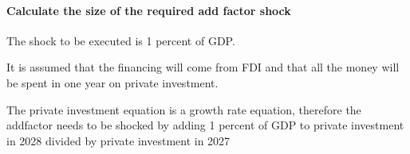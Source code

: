 \documentclass[letterpaper,10pt,english]{jupyterBook}
\begin{document}
\paragraph{Calculate the size of the required add factor shock}
\label{\detokenize{content/06_WBModels/ScenarioAnalysis:calculate-the-size-of-the-required-add-factor-shock}}
\sphinxAtStartPar
The shock to be executed is 1 percent of GDP.

\sphinxAtStartPar
It is assumed that the financing will come from FDI and that all the money will be spent in one year on private investment.

\sphinxAtStartPar
The private investment equation is a growth rate equation, therefore the add\sphinxhyphen{}factor needs to be shocked by adding 1 percent of GDP to private investment in 2028 divided by private investment in 2027
\end{document}

